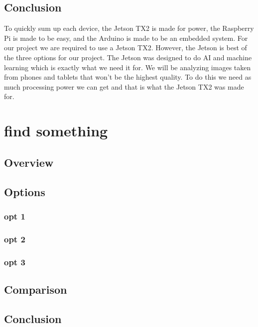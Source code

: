 \documentclass[onecolumn, draftclsnofoot,10pt, compsoc]{IEEEtran}
\begin{document}
	\subsection{Conclusion}
		To quickly sum up each device, the Jetson TX2 is made for power, the Raspberry Pi is made to be easy, and the Arduino is made to be an embedded system.
		For our project we are required to use a Jetson TX2.
		However, the Jetson is best of the three options for our project.
		The Jetson was designed to do AI and machine learning which is exactly what we need it for.
		We will be analyzing images taken from phones and tablets that won't be the highest quality.
		To do this we need as much processing power we can get and that is what the Jetson TX2 was made for.

\section{find something}
	\subsection{Overview}
		

	\subsection{Options}
		\subsubsection{opt 1}
			

		\subsubsection{opt 2}
			

		\subsubsection{opt 3}
			

	\subsection{Comparison}
		

	\subsection{Conclusion}



\end{document}
